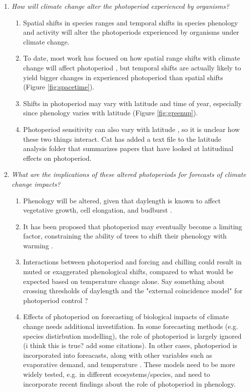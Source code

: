 \documentclass{article}
\begin{document}
\begin{enumerate}
\item\textit{How will climate change alter the photoperiod experienced by organisms?}
\begin{enumerate}
\item Spatial shifts in species ranges and temporal shifts in species phenology and activity will alter the photoperiods experienced by organisms under climate change.
\item  To date, most work has focused on how spatial range shifts with climate change will affect photoperiod \citep{saikkonen2012}, but temporal shifts are actually likely to yield bigger changes in experienced photoperiod than spatial shifts (Figure \ref{fig:spacetime}).
\item Shifts in photoperiod may vary with latitude and time of year, especially since phenology varies with latitude (Figure \ref{fig:greenup}).
\item Photoperiod sensitivity can also vary with latitude \citep{Howe:1996,saikkonen2012,Partanen:2005aa,Vihera-Aarnio:2006aa,Caffarra:2011b,gauzere2017}, so it is unclear how these two things interact. Cat has added a text file to the latitude analysis folder that summarizes papers that have looked at latitudinal effects on photoperiod.
\end{enumerate}
\item\textit{What are the implications of these altered photoperiods for forecasts of climate change impacts?}
\begin{enumerate}
\item Phenology will be altered, given that daylength is known to affect vegetative growth, cell elongation, and budburst \citep{Linkosalo:2006aa,erwin1998,sidaway2010, Hsu:2011}.
\item It has been proposed that photoperiod may eventually become a limiting factor, constraining the ability of trees to shift their phenology with warming \citep{koerner2010b,vitasse2013, Morin:2010aa}. 
\item Interactions between photoperiod and forcing and chilling could result in muted or exaggerated phenological shifts, compared to what would be expected based on temperature change alone. Say something about crossing thresholds of daylength and the "external coincidence model" for photoperiod control \citep{bastow2002,kobayashi2007,andres2012,Singh:2017}?
\item Effects of photoperiod on forecasting of biological impacts of climate change needs additional investifation. In some forecasting methods (e.g. species distirbution modelling), the role of photoperiod is largely ignored (i think this is true? add some citations). In other cases, photoperiod is incorporated into foreacasts, along with other variables such as evaporative demand, and temperature \citep [e.g. ED] []{jolly2005, medvigy2013}. These models need to be more widely tested, e.g. in different ecosystems/species, and need to incorporate recent findings about the role of photoperiod in phenology.     

\end{enumerate}
\end{enumerate}
\end{document}
